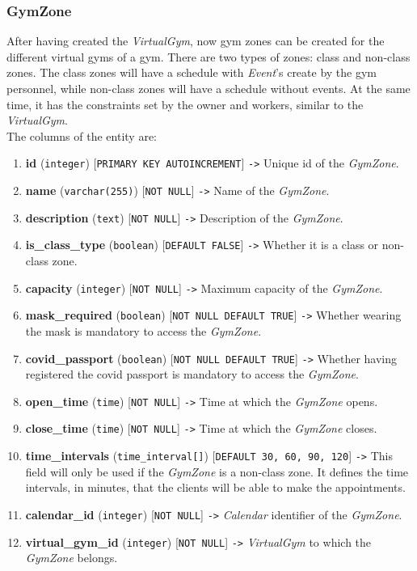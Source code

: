 \documentclass[a4paper, 12pt, oneside]{book}
\begin{document}
\subsubsection{GymZone}
After having created the \emph{VirtualGym}, now gym zones can be created for the different virtual gyms of a gym. There are two types of zones: class and non-class zones. The class zones will have a schedule with \emph{Event}'s create by the gym personnel, while non-class zones will have a schedule without events. At the same time, it has the constraints set by the owner and workers, similar to the \emph{VirtualGym}.
\\[8pt]
The columns of the entity are:
\begin{enumerate}[label = -]
	\item \textbf{id} (\texttt{integer}) [\texttt{PRIMARY KEY AUTOINCREMENT}] \texttt{->} Unique id of the \emph{GymZone}.
	\item \textbf{name} (\texttt{varchar(255)}) [\texttt{NOT NULL}] \texttt{->} Name of the \emph{GymZone}.
	\item \textbf{description} (\texttt{text}) [\texttt{NOT NULL}] \texttt{->} Description of the \emph{GymZone}.
	\item \textbf{is\_class\_type} (\texttt{boolean}) [\texttt{DEFAULT FALSE}] \texttt{->} Whether it is a class or non-class zone.
	\item \textbf{capacity} (\texttt{integer}) [\texttt{NOT NULL}] \texttt{->} Maximum capacity of the \emph{GymZone}.
	\item \textbf{mask\_required} (\texttt{boolean}) [\texttt{NOT NULL DEFAULT TRUE}] \texttt{->} Whether wearing the mask is mandatory to access the \emph{GymZone}.
	\item \textbf{covid\_passport} (\texttt{boolean}) [\texttt{NOT NULL DEFAULT TRUE}] \texttt{->} Whether having registered the covid passport is mandatory to access the \emph{GymZone}.
	\item \textbf{open\_time} (\texttt{time}) [\texttt{NOT NULL}] \texttt{->} Time at which the \emph{GymZone} opens.
	\item \textbf{close\_time} (\texttt{time}) [\texttt{NOT NULL}] \texttt{->} Time at which the \emph{GymZone} closes.
	\item \textbf{time\_intervals} (\texttt{time\_interval[]}) [\texttt{DEFAULT {30, 60, 90, 120}}] \texttt{->} This field will only be used if the \emph{GymZone} is a non-class zone. It defines the time intervals, in minutes, that the clients will be able to make the appointments.
	\item \textbf{calendar\_id} (\texttt{integer}) [\texttt{NOT NULL}] \texttt{->} \emph{Calendar} identifier of the \emph{GymZone}.
	\item \textbf{virtual\_gym\_id} (\texttt{integer}) [\texttt{NOT NULL}] \texttt{->} \emph{VirtualGym} to which the \emph{GymZone} belongs.
\end{enumerate}
\end{document}
